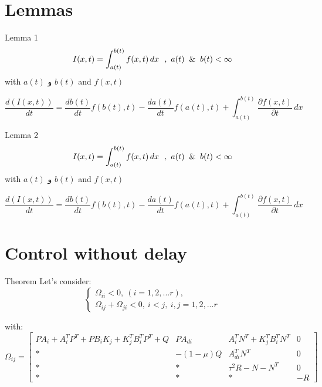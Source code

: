 \documentclass[dvipsnames,mathserif]{beamer}
\begin{document}
{\section{Lemmas}
    \begin{frame}
    \footnotesize
       \begin{block}{Lemma 1}
        \begin{equation*}
           I(x,t)=\int_{a(t)}^{b(t)} f(x,t) \,dx \  \ ,  \ a(t) \And b(t)<\infty
         \end{equation*}
              with 
              $a(t)$ و $b(t)$  
and               $f(x,t)$
                
         \begin{equation*}
   \frac{d(I(x,t))}{dt}=\frac{db(t)}{dt}f(b(t),t)-\frac{da(t)}{dt}f(a(t),t)+\int_{a(t)}^{b(t)} \frac{\partial f(x,t)}{\partial t} \,dx  
   \end{equation*}
       \end{block}
\begin{block}{Lemma 2}
        \begin{equation*}
           I(x,t)=\int_{a(t)}^{b(t)} f(x,t) \,dx \  \ ,  \ a(t) \And b(t)<\infty
         \end{equation*}
              with 
              $a(t)$ و $b(t)$  
and               $f(x,t)$
                
         \begin{equation*}
   \frac{d(I(x,t))}{dt}=\frac{db(t)}{dt}f(b(t),t)-\frac{da(t)}{dt}f(a(t),t)+\int_{a(t)}^{b(t)} \frac{\partial f(x,t)}{\partial t} \,dx  
   \end{equation*}
       \end{block}
\end{frame}    %


\footnotesize

\section{Control without delay}
\begin{frame}
\footnotesize
\begin{block}{Theorem}
Let's consider:
\begin{equation*}
\left\{\begin{array}{l}
{\Omega_{ii}}< 0,\   (i=1,2,...r) , \\
{\Omega_{ij}}+{\Omega_{ji}}<0,\ i<j ,\ i,j=1,2,...r
\end{array}\right.
\end{equation*}
\end{block}
with:
\tiny
\begin{equation*}
\Omega_{ij}= \left[\begin{array}{cccc}
PA_i+A_i^TP^T+PB_iK_j+K_j^TB_i^TP^T+Q& PA_{di}& A_i^TN^T+K_j^TB_i^TN^T & 0 \\ *& -(1-\mu)Q& A_{di}^TN^T & 0\\ *&*&\tau^2R-N-N^T & 0\\ * &* &* &-R 
   \end{array}\right]
\end{equation*}
\end{frame}
}
\end{document}
